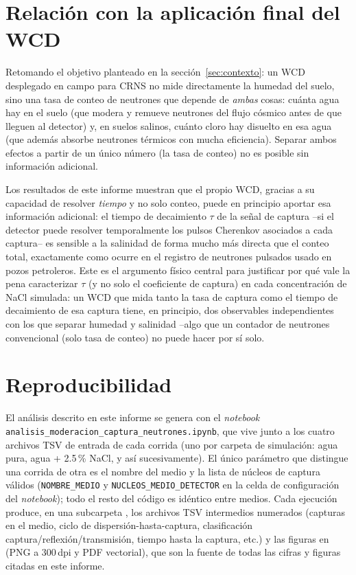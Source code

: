 \documentclass[11pt,a4paper]{article}
\newcommand{\codigo}[1]{\nolinkurl{#1}}
\newcommand{\archivo}[1]{\path{#1}}
\newcommand{\var}[1]{\texttt{#1}}
\begin{document}
\section{Relación con la aplicación final del WCD}

Retomando el objetivo planteado en la sección~\ref{sec:contexto}: un WCD desplegado en campo para
CRNS no mide directamente la humedad del suelo, sino una tasa de conteo de neutrones que depende de
\emph{ambas} cosas: cuánta agua hay en el suelo (que modera y remueve neutrones del flujo cósmico
antes de que lleguen al detector) y, en suelos salinos, cuánto cloro hay disuelto en esa agua (que
además absorbe neutrones térmicos con mucha eficiencia). Separar ambos efectos a partir de un único
número (la tasa de conteo) no es posible sin información adicional.

Los resultados de este informe muestran que el propio WCD, gracias a su capacidad de resolver
\emph{tiempo} y no solo conteo, puede en principio aportar esa información adicional: el tiempo de
decaimiento $\tau$ de la señal de captura --si el detector puede resolver temporalmente los pulsos
Cherenkov asociados a cada captura-- es sensible a la salinidad de forma mucho más directa que el
conteo total, exactamente como ocurre en el registro de neutrones pulsados usado en pozos
petroleros. Este es el argumento físico central para justificar por qué vale la pena caracterizar
$\tau$ (y no solo el coeficiente de captura) en cada concentración de NaCl simulada: un WCD que mida
tanto la tasa de captura como el tiempo de decaimiento de esa captura tiene, en principio, dos
observables independientes con los que separar humedad y salinidad --algo que un contador de
neutrones convencional (solo tasa de conteo) no puede hacer por sí solo.

\section{Reproducibilidad}
\label{sec:reprod}

El análisis descrito en este informe se genera con el \textit{notebook}
\codigo{analisis\_moderacion\_captura\_neutrones.ipynb}, que vive junto a los cuatro archivos TSV de
entrada de cada corrida (uno por carpeta de simulación: agua pura, agua + 2.5\,\% NaCl, y así
sucesivamente). El único parámetro que distingue una corrida de otra es el nombre del medio y la
lista de núcleos de captura válidos (\var{NOMBRE\_MEDIO} y \var{NUCLEOS\_MEDIO\_DETECTOR} en la
celda de configuración del \textit{notebook}); todo el resto del código es idéntico entre medios.
Cada ejecución produce, en una subcarpeta \archivo{Salidas/}, los archivos TSV intermedios
numerados (capturas en el medio, ciclo de dispersión-hasta-captura, clasificación
captura/reflexión/transmisión, tiempo hasta la captura, etc.) y las figuras en
\archivo{Salidas/figuras/} (PNG a 300\,dpi y PDF vectorial), que son la fuente de todas las cifras y
figuras citadas en este informe.
\end{document}
